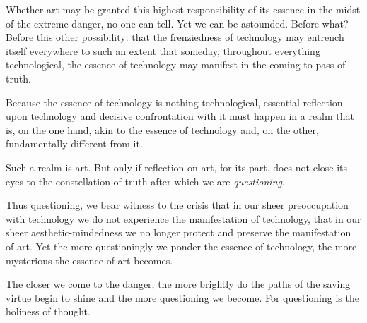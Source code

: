 \documentclass[12pt]{article}
\begin{document}
Whether art may be granted this highest responsibility of its essence in the midst of the extreme danger, no one can tell. Yet we can be astounded. Before what? Before this other possibility: that the frenziedness of technology may entrench itself everywhere to such an extent that someday, throughout everything technological, the essence of technology may manifest in the coming-to-pass of truth.

Because the essence of technology is nothing technological, essential reflection upon technology and decisive confrontation with it must happen in a realm that is, on the one hand, akin to the essence of technology and, on the other, fundamentally different from it.

Such a realm is art. But only if reflection on art, for its part, does not close its eyes to the constellation of truth after which we are \textit{questioning}.

Thus questioning, we bear witness to the crisis that in our sheer preoccupation with technology we do not experience the manifestation of technology, that in our sheer aesthetic-mindedness we no longer protect and preserve the manifestation of art. Yet the more questioningly we ponder the essence of technology, the more mysterious the essence of art becomes.

The closer we come to the danger, the more brightly do the paths of the saving virtue begin to shine and the more questioning we become. For questioning is the holiness of thought.
\end{document}
